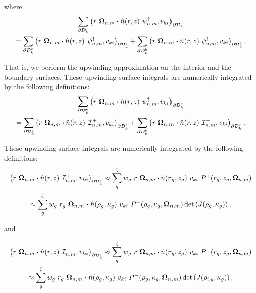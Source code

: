 \documentclass[12pt]{article}
\begin{document}
\noindent where
\begin{multline}
\sum_{\partial \mathcal{D}_k} \left(r\ \vec{\Omega}_{n,m} \vd \hat{n}(r,z)\ \psi_{n,m}^\uparrow, v_{ki} \right)_{\partial \mathcal{D}_k} \\
= \sum_{\partial \mathcal{D}_k^e} \left(r\ \vec{\Omega}_{n,m} \vd \hat{n}(r,z)\ \psi_{n,m}^\uparrow, v_{ki} \right)_{\partial \mathcal{D}_k^e} + \sum_{\partial \mathcal{D}_k^b} \left(r\ \vec{\Omega}_{n,m} \vd \hat{n}(r,z)\ \psi_{n,m}^\uparrow, v_{ki} \right)_{\partial \mathcal{D}_k^b}.
\end{multline}

\noindent That is, we perform the upwinding approximation on the interior and the boundary surfaces. These upwinding surface integrals are numerically integrated by the following definitions:
\begin{multline}
\sum_{\partial \mathcal{D}_k^e} \left(r\ \vec{\Omega}_{n,m} \vd \hat{n}(r,z)\ \psi_{n,m}^\uparrow, v_{ki} \right)_{\partial \mathcal{D}_k^e} \\
= \sum_{\partial \mathcal{D}_k^e} \left(r\ \vec{\Omega}_{n,m} \vd \hat{n}(r,z)\ \mathcal{I}_{n,m}^+, v_{ki} \right)_{\partial \mathcal{D}_k^e} + \sum_{\partial \mathcal{D}_k^e} \left(r\ \vec{\Omega}_{n,m} \vd \hat{n}(r,z)\ \mathcal{I}_{n,m}^-, v_{ki} \right)_{\partial \mathcal{D}_k^e},
\label{eq:splitUpwind}
\end{multline}

\noindent These upwinding surface integrals are numerically integrated by the following definitions:
\begin{multline}
\left(r\ \vec{\Omega}_{n,m} \vd \hat{n}(r,z)\ \mathcal{I}_{n,m}^+, v_{ki} \right)_{\partial \mathcal{D}_k^e} \approx \sum_{g}^\zeta w_g\ r\ \vec{\Omega}_{n,m} \vd \hat{n}(r_g,z_g)\ v_{ki}\ P^+(r_g, z_g, \vec{\Omega}_{n,m}) \\
\approx \sum_{g}^\zeta w_g\ r_g\ \vec{\Omega}_{n,m} \vd \hat{n}(\rho_{g}, \kappa_{g})\ v_{ki}\ P^+(\rho_{g}, \kappa_{g}, \vec{\Omega}_{n,m}) \det \left(J(\rho_{g}, \kappa_{g}) \right),
\end{multline}

\noindent and

\begin{multline}
\left(r\ \vec{\Omega}_{n,m} \vd \hat{n}(r,z)\ \mathcal{I}_{n,m}^-, v_{ki} \right)_{\partial \mathcal{D}_k^e} \approx \sum_{g}^\zeta w_g\ r\ \vec{\Omega}_{n,m} \vd \hat{n}(r_g, z_g)\ v_{ki}\ P^-(r_g, z_g, \vec{\Omega}_{n,m}) \\
\approx \sum_{g}^\zeta w_g\ r_g\ \vec{\Omega}_{n,m} \vd \hat{n}(\rho_{g}, \kappa_{g})\ v_{ki}\ P^-(\rho_{g}, \kappa_{g}, \vec{\Omega}_{n,m}) \det \left(J(\rho_{i,g}, \kappa_{g}) \right),
\end{multline}
\end{document}
